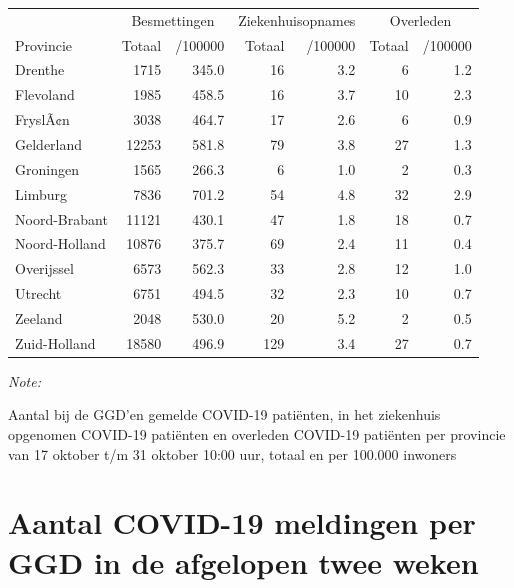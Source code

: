 \documentclass[
  english,
  man,floatsintext]{apa6}
\begin{document}
\begin{table}
\centering
\begin{threeparttable}
\begin{tabular}{lrrrrrr}
\toprule
\multicolumn{1}{c}{ } & \multicolumn{2}{c}{Besmettingen} & \multicolumn{2}{c}{Ziekenhuisopnames} & \multicolumn{2}{c}{Overleden} \\
\cmidrule(l{3pt}r{3pt}){2-3} \cmidrule(l{3pt}r{3pt}){4-5} \cmidrule(l{3pt}r{3pt}){6-7}
Provincie & Totaal & /100000 & Totaal & /100000 & Totaal & /100000\\
\midrule
Drenthe & 1715 & 345.0 & 16 & 3.2 & 6 & 1.2\\
Flevoland & 1985 & 458.5 & 16 & 3.7 & 10 & 2.3\\
FryslÃ¢n & 3038 & 464.7 & 17 & 2.6 & 6 & 0.9\\
Gelderland & 12253 & 581.8 & 79 & 3.8 & 27 & 1.3\\
Groningen & 1565 & 266.3 & 6 & 1.0 & 2 & 0.3\\
Limburg & 7836 & 701.2 & 54 & 4.8 & 32 & 2.9\\
Noord-Brabant & 11121 & 430.1 & 47 & 1.8 & 18 & 0.7\\
Noord-Holland & 10876 & 375.7 & 69 & 2.4 & 11 & 0.4\\
Overijssel & 6573 & 562.3 & 33 & 2.8 & 12 & 1.0\\
Utrecht & 6751 & 494.5 & 32 & 2.3 & 10 & 0.7\\
Zeeland & 2048 & 530.0 & 20 & 5.2 & 2 & 0.5\\
Zuid-Holland & 18580 & 496.9 & 129 & 3.4 & 27 & 0.7\\
\bottomrule
\end{tabular}
\begin{tablenotes}
\item \textit{Note: } 
\item Aantal bij de GGD’en gemelde COVID-19 patiënten, in het ziekenhuis opgenomen COVID-19 patiënten en overleden COVID-19 patiënten per provincie van 17 oktober t/m 31 oktober 10:00 uur, totaal en per 100.000 inwoners
\end{tablenotes}
\end{threeparttable}
\end{table}

\newpage

\hypertarget{aantal-covid-19-meldingen-per-ggd-in-de-afgelopen-twee-weken}{%
\section{Aantal COVID-19 meldingen per GGD in de afgelopen twee weken}\label{aantal-covid-19-meldingen-per-ggd-in-de-afgelopen-twee-weken}}
\end{document}
